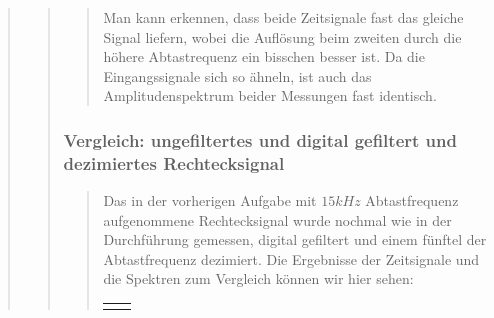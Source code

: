 \begin{quote}
\begin{quote}
\begin{quote}
        	\vspace{1.5em}
    	
    	Man kann erkennen, dass beide Zeitsignale fast das gleiche Signal liefern,
    	wobei die Auflösung beim zweiten durch die höhere Abtastrequenz ein
    	bisschen besser ist. Da die Eingangssignale sich so ähneln, ist auch das
    	Amplitudenspektrum beider Messungen fast identisch.
    			
    	\end{quote}
    
        \subsubsection{Vergleich: ungefiltertes und digital gefiltert und
        dezimiertes Rechtecksignal}
        \begin{quote}
        
        Das in der vorherigen Aufgabe mit $15 kHz$ Abtastfrequenz
        aufgenommene Rechtecksignal wurde nochmal wie in der Durchführung gemessen, digital
        gefiltert und einem fünftel der Abtastfrequenz dezimiert. Die Ergebnisse
        der Zeitsignale und die Spektren zum Vergleich können wir hier sehen:
        
        \begin{center}
                \begin{tabular}{ll}
    
                \hspace{-12em}
                    \begin{minipage}{0.6\textwidth}
    

\end{minipage}
\end{tabular}
\end{center}
\end{quote}
\end{quote}
\end{quote}

